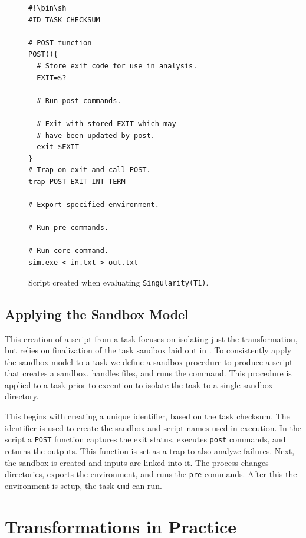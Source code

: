 \documentclass[conference]{IEEEtran}
\begin{document}
\begin{figure}[h]
\begin{framed}
\small
\begin{verbatim}
#!\bin\sh
#ID TASK_CHECKSUM

# POST function
POST(){
  # Store exit code for use in analysis.
  EXIT=$?
  
  # Run post commands.
  
  # Exit with stored EXIT which may
  # have been updated by post.
  exit $EXIT
}
# Trap on exit and call POST.
trap POST EXIT INT TERM

# Export specified environment.

# Run pre commands.

# Run core command.
sim.exe < in.txt > out.txt
\end{verbatim}
\end{framed}
\caption{Script created when evaluating {\tt Singularity(T1)}.}
\label{task-script}
\end{figure}


\subsection{Applying the Sandbox Model}

This creation of a script from a task
focuses on isolating just the transformation,
but relies on finalization of the task sandbox
laid out in .
To consistently apply the sandbox model to a task
we define a sandbox procedure to produce a script
that creates a sandbox, handles files, and runs
the command. This procedure is applied to a 
task prior to execution to isolate the task to 
a single sandbox directory.

This begins with 
creating a unique identifier, based on the task checksum.
The identifier is used to create the 
sandbox and script names used in execution. In the 
script a {\tt POST} function captures
the exit status, executes {\tt post} commands, and
returns the outputs. 
This function is set as a trap to
also analyze failures.
Next, the sandbox is created and 
inputs are linked into it. 
The process changes directories,
exports the environment, and
runs the {\tt pre} commands.
After this the environment is setup,
the task {\tt cmd} can run.


\section{Transformations in Practice}
\end{document}
